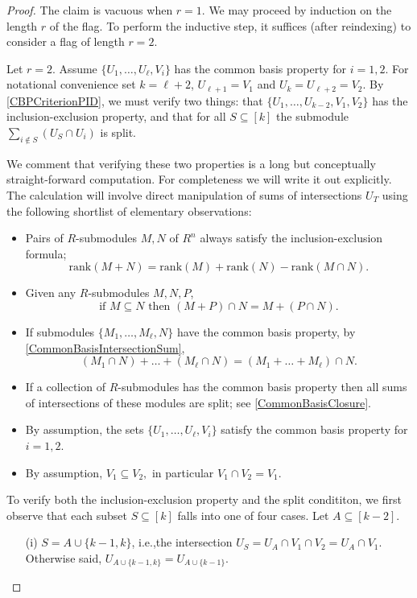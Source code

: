 \documentclass[a4paper]{amsart}
\numberwithin{theoremcounter}{section}
\theoremstyle{definition}
\theoremstyle{remark}
\begin{document}
\begin{proof}   The claim is vacuous when $r=1$. We may proceed by induction on the length  $r$ of the flag. To perform the inductive step, it suffices (after reindexing) to consider a flag of length $r=2$. 

Let $r=2$. Assume $\{U_1, \dots, U_{\ell}, V_i\}$ has the common basis property for $i=1, 2$.  For notational convenience set $k={\ell}+2$, $U_{{\ell}+1}=V_1$ and $U_k = U_{{\ell}+2}=V_2$. 
By \autoref{CBPCriterionPID}, we must verify two things: that $\{U_1, \dots, U_{k-2}, V_1, V_2\}$ has the inclusion-exclusion property, and that for all $S \subseteq [k]$ the submodule $\sum_{i \notin S} (U_S \cap U_i)$  is split. 

We comment that verifying these two properties is a long but conceptually straight-forward computation. For completeness we will write it out explicitly. The calculation will involve direct manipulation of sums of intersections $U_T$ using the following shortlist of elementary observations: 
\begin{itemize}
\item Pairs of $R$-submodules $M,N$ of $R^n$ always satisfy the inclusion-exclusion formula; 
$$ \mathrm{rank}(M+N) =  \mathrm{rank}(M) +  \mathrm{rank}(N) -  \mathrm{rank}(M\cap N).$$ 
\item Given any $R$-submodules $M,N,P$, $$ \text{if $M \subseteq N$ then } (M+P)\cap N = M + (P \cap N).$$ 
\item If submodules $\{M_1, \dots, M_{\ell}, N\}$ have the common basis property, by \autoref{CommonBasisIntersectionSum}, $$(M_1 \cap N) + \dots + (M_{\ell} \cap N) = (M_1 + \dots  +M_{\ell}) \cap N.$$  
\item If a collection of $R$-submodules has the common basis property then all sums of intersections of these modules are split; see  \autoref{CommonBasisClosure}.
\item By assumption, the sets $\{U_1, \dots, U_{\ell}, V_i\}$ satisfy the common basis property for $i=1,2$.
\item By assumption, $V_1 \subseteq V_2,$ in particular $V_1 \cap V_2 = V_1$.
\end{itemize} 

To verify both the inclusion-exclusion property and the split condititon, we first observe that each subset $S \subseteq [k]$ falls into one of four cases. Let $A \subseteq [k-2]$. 
\begin{enumerate}
\item[(i)] $S = A \cup \{k-1, k\}$, i.e.,the intersection $U_S = U_A \cap V_1 \cap V_2 = U_A \cap V_1$. \\  Otherwise said, $U_{A \cup \{k-1, k\}} = U_{A \cup \{k-1\}}$. 


\end{enumerate}
\end{proof}
\end{document}
